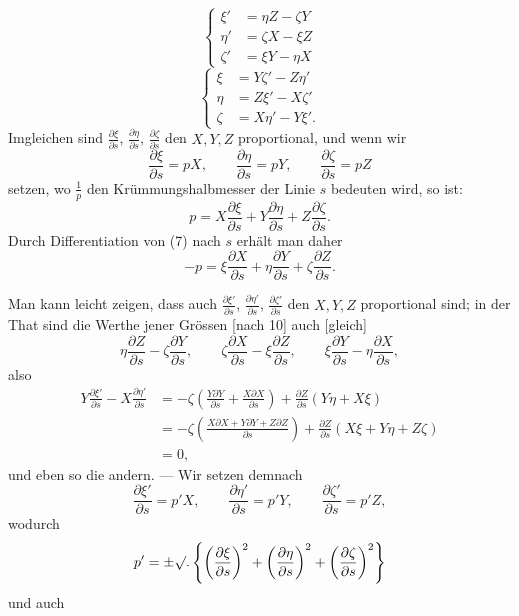 %
\begin{equation}
\left\{\begin{aligned}\xi'&=\eta Z-\zeta Y\\\eta'&=\zeta X-\xi Z\\\zeta'&=\xi Y-\eta X\end{aligned}\right.\tag*{[10]}
\end{equation}
\begin{equation}
\left\{\begin{aligned}\xi&=Y\zeta'-Z\eta'\\\eta&=Z\xi'-X\zeta'\\\zeta&=X\eta'-Y\xi'.\end{aligned}\right.\tag*{[11]}
\end{equation}
\indent Imgleichen sind $\frac{\partial\xi}{\partial s}$, $\frac{\partial\eta}{\partial s}$, $\frac{\partial\zeta}{\partial s}$ den $X,Y,Z$ proportional, und wenn wir
\[
\frac{\partial\xi}{\partial s}=pX,\qquad\frac{\partial\eta}{\partial s}=pY,\qquad\frac{\partial\zeta}{\partial s}=pZ
\]
setzen, wo $\frac1p$ den Krümmungshalbmesser der Linie $s$ bedeuten wird, so ist:
\[
p=X\frac{\partial\xi}{\partial s}+Y\frac{\partial\eta}{\partial s}+Z\frac{\partial\zeta}{\partial s}.
\]
Durch Differentiation von (7) nach $s$ erhält man daher
\[
-p=\xi\frac{\partial X}{\partial s}+\eta\frac{\partial Y}{\partial s}+\zeta\frac{\partial Z}{\partial s}.
\]

Man kann leicht zeigen, dass auch $\frac{\partial\xi'}{\partial s}$, $\frac{\partial\eta'}{\partial s}$, $\frac{\partial\zeta'}{\partial s}$ den $X,Y,Z$ proportional sind; in der That sind die Werthe jener Grössen [nach 10] auch [gleich]
\[
\eta\frac{\partial Z}{\partial s}-\zeta\frac{\partial Y}{\partial s},\qquad\zeta\frac{\partial X}{\partial s}-\xi\frac{\partial Z}{\partial s},\qquad\xi\frac{\partial Y}{\partial s}-\eta\frac{\partial X}{\partial s},
\]
also
\[
\begin{aligned}
Y\frac{\partial\xi'}{\partial s}-X\frac{\partial\eta'}{\partial s}&=-\zeta\left(\frac{Y\partial Y}{\partial s}+\frac{X\partial X}{\partial s}\right)+\frac{\partial Z}{\partial s}(Y\eta+X\xi)\\
&=-\zeta\left(\frac{X\partial X+Y\partial Y+Z\partial Z}{\partial s}\right)+\frac{\partial Z}{\partial s}(X\xi+Y\eta+Z\zeta)\\
&=0,
\end{aligned}
\]
und eben so die andern. — Wir setzen demnach
\[
\frac{\partial\xi'}{\partial s}=p'X,\qquad\frac{\partial\eta'}{\partial s}=p'Y,\qquad\frac{\partial\zeta'}{\partial s}=p'Z,
\]
wodurch
\[
p'=\pm\mathord{\surd}.\left\{\left(\frac{\partial\xi}{\partial s}\right)^{2}+\left(\frac{\partial\eta}{\partial s}\right)^{2}+\left(\frac{\partial\zeta}{\partial s}\right)^{2}\right\}
\]
und auch
